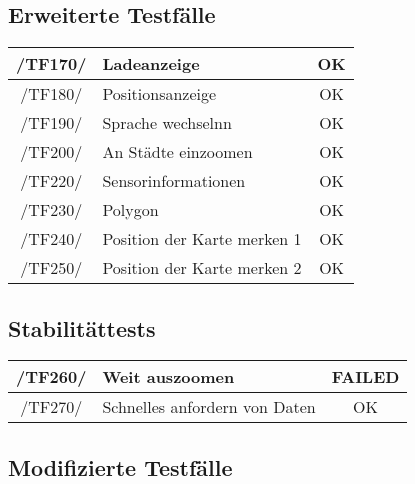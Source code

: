 \subsection{Erweiterte Testfälle}

\begin{center}
    \begin{tabular}[h]{|c|l|c|}
        /TF170/ & Ladeanzeige & \cellcolor{green!25}OK \\
        \hline
        /TF180/ & Positionsanzeige & \cellcolor{green!25}OK \\
        \hline
         /TF190/ & Sprache wechselnn & \cellcolor{green!25}OK \\
        \hline
         /TF200/ & An Städte einzoomen & \cellcolor{green!25}OK \\
        \hline
        /TF220/ & Sensorinformationen & \cellcolor{green!25}OK \\
        \hline
         /TF230/ & Polygon & \cellcolor{green!25}OK \\
        \hline
         /TF240/ & Position der Karte merken 1 & \cellcolor{green!25}OK \\
        \hline
          /TF250/ & Position der Karte merken 2 & \cellcolor{green!25}OK \\
        \hline

    \end{tabular}
\end{center}

\subsection{Stabilitättests}
  \begin{center}
      \begin{tabular}[h]{|c|l|c|}
       /TF260/ & Weit auszoomen & \cellcolor{red!25}FAILED \\
        \hline
          /TF270/ & Schnelles anfordern von Daten & \cellcolor{green!25}OK \\
        \hline
      \end{tabular}
  \end{center}

\subsection{Modifizierte Testfälle}

